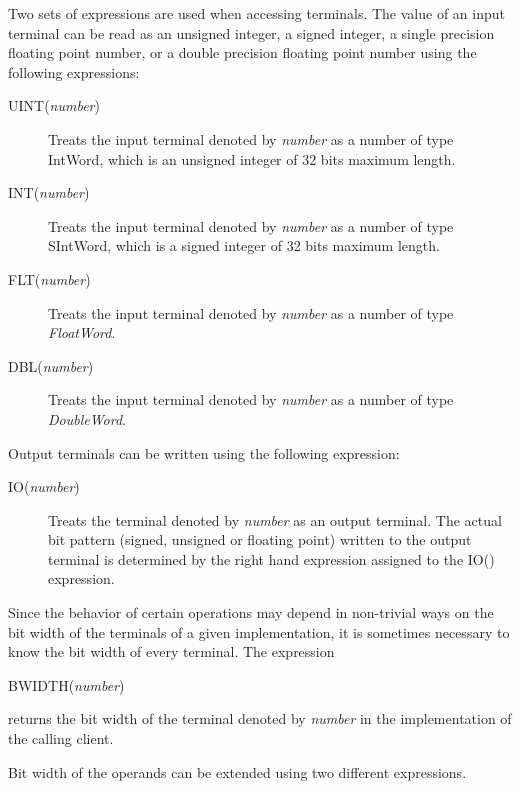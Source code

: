 \documentclass[a4paper,twoside]{tceusermanual}
\begin{document}
Two sets of expressions are used when accessing terminals. The value of
an input terminal
can be read as an unsigned integer, a signed integer, a single precision 
floating point number, or
a double precision floating point number using the following expressions:
\begin{description}
\item[UINT(\emph{number})] %
  Treats the input terminal denoted by \emph{number} as a number of type
  IntWord, which is an unsigned integer of 32 bits maximum length.
\item[INT(\emph{number})] %
  Treats the input terminal denoted by \emph{number} as a number of type
  SIntWord, which is a signed integer of 32 bits maximum length.
\item[FLT(\emph{number})] %
  Treats the input terminal denoted by \emph{number} as a number of type
  \emph{FloatWord}.
\item[DBL(\emph{number})] %
  Treats the input terminal denoted by \emph{number} as a number of type
  \emph{DoubleWord}.
\end{description}

Output terminals can be written using the following expression:
\begin{description}
\item[IO(\emph{number})] %
   Treats the terminal denoted by \emph{number} as an output terminal.
   The actual bit pattern (signed, unsigned or floating point) written to
   the output terminal is determined by the right hand expression
   assigned to the IO() expression.
\end{description}

Since the behavior of certain operations may depend in non-trivial ways on
the bit width of the terminals of a given implementation, it is sometimes
necessary to know the bit width of every terminal.  The expression
\begin{description}
\item[BWIDTH(\emph{number})]
\end{description}
returns the bit width of the terminal denoted by \emph{number} in the
implementation of the calling client.

Bit width of the operands can be extended using two different expressions.
\end{document}
